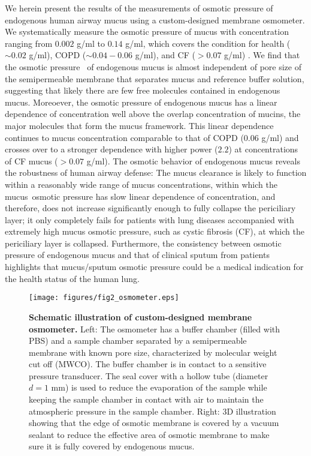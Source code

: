 \documentclass[8.5pt,twoside,twocolumn]{article}
\begin{document}
We herein present the results of the measurements of osmotic pressure of
endogenous human airway mucus using a custom-designed membrane osmometer. We
systematically measure the osmotic pressure of mucus with concentration
ranging from $0.002$ g/ml to $0.14$ g/ml, which covers the condition for
health ($\sim 0.02$ g/ml), COPD ($\sim 0.04-0.06$ g/ml)\cite{Hogg2004}, and
CF ($>0.07$ g/ml) \cite{Tarran2004, LW1963}. We find that the osmotic
pressure \ of endogenous mucus is almost independent of pore size of the
semipermeable membrane that separates mucus and reference buffer solution,
suggesting that likely there are few free molecules contained in endogenous
mucus. Moreoever, the osmotic pressure of endogenous mucus has a linear
dependence of concentration well above the overlap concentration of mucins,
the major molecules that form the mucus framework. This linear dependence
continues to mucus concentration comparable to that of COPD ($0.06$ g/ml)
and crosses over to a stronger dependence with higher power ($2.2$) at
concentrations of CF mucus ($>0.07$ g/ml). The osmotic behavior of
endogenous mucus reveals the robustness of human airway defense: The mucus
clearance is likely to function within a reasonably wide range of mucus
concentrations, within which the mucus\ osmotic pressure has slow linear
dependence of concentration, and therefore, does not increase significantly
enough to fully collapse the periciliary layer; it only completely fails for
patients with lung diseases accompanied with extremely high mucus osmotic
pressure, such as cystic fibrosis (CF), at which the periciliary layer is
collapsed. Furthermore, the consistency between osmotic pressure of
endogenous mucus and that of clinical sputum from patients highlights that
mucus/sputum osmotic pressure could be a medical indication for the health
status of the human lung.

\begin{figure}[h]
\centering
\texttt{[image: figures/fig2\_osmometer.eps]}
\caption{\textbf{Schematic illustration of custom-designed membrane
osmometer.} Left: The osmometer has a buffer chamber (filled with PBS) and a
sample chamber separated by a semipermeable membrane with known pore size,
characterized by molecular weight cut off (MWCO). The buffer chamber is in
contact to a sensitive pressure transducer. The seal cover with a hollow
tube (diameter $d=1$ mm) is used to reduce the evaporation of the sample
while keeping the sample chamber in contact with air to maintain the
atmospheric pressure in the sample chamber. Right: 3D illustration showing
that the edge of osmotic membrane is covered by a vacuum sealant to reduce
the effective area of osmotic membrane to make sure it is fully covered by
endogenous mucus.}
\label{fig:osmometer}
\end{figure}
\end{document}
